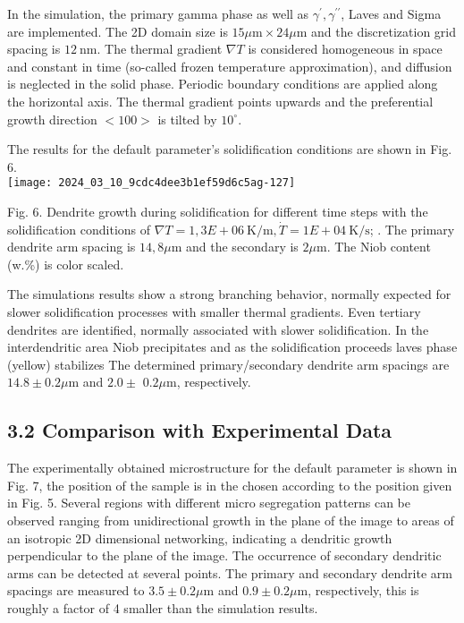 \documentclass[10pt]{article}
\begin{document}
In the simulation, the primary gamma phase as well as $\gamma^{\prime}, \gamma^{\prime \prime}$, Laves and Sigma are implemented. The 2D domain size is $15 \mu \mathrm{m} \times 24 \mu \mathrm{m}$ and the discretization grid spacing is $12 \mathrm{~nm}$. The thermal gradient $\nabla T$ is considered homogeneous in space and constant in time (so-called frozen temperature approximation), and diffusion is neglected in the solid phase. Periodic boundary conditions are applied along the horizontal axis. The thermal gradient points upwards and the preferential growth direction $<100>$ is tilted by $10^{\circ}$.

The results for the default parameter's solidification conditions are shown in Fig. 6.\\
\texttt{[image: 2024\_03\_10\_9cdc4dee3b1ef59d6c5ag-127]}

Fig. 6. Dendrite growth during solidification for different time steps with the solidification conditions of $\nabla T=1,3 E+06 \mathrm{~K} / \mathrm{m}, \dot{T}=1 E+04 \mathrm{~K} / \mathrm{s}$; . The primary dendrite arm spacing is $14,8 \mu \mathrm{m}$ and the secondary is $2 \mu \mathrm{m}$. The Niob content (w.\%) is color scaled.

The simulations results show a strong branching behavior, normally expected for slower solidification processes with smaller thermal gradients. Even tertiary dendrites are identified, normally associated with slower solidification. In the interdendritic area Niob precipitates and as the solidification proceeds laves phase (yellow) stabilizes The determined primary/secondary dendrite arm spacings are $14.8 \pm 0.2 \mu \mathrm{m}$ and $2.0 \pm$ $0.2 \mu \mathrm{m}$, respectively.

\subsection*{3.2 Comparison with Experimental Data}
The experimentally obtained microstructure for the default parameter is shown in Fig. 7, the position of the sample is in the chosen according to the position given in Fig. 5. Several regions with different micro segregation patterns can be observed ranging from unidirectional growth in the plane of the image to areas of an isotropic 2D dimensional networking, indicating a dendritic growth perpendicular to the plane of the image. The occurrence of secondary dendritic arms can be detected at several points. The primary and secondary dendrite arm spacings are measured to $3.5 \pm 0.2 \mu \mathrm{m}$ and $0.9 \pm 0.2 \mu \mathrm{m}$, respectively, this is roughly a factor of 4 smaller than the simulation results.
\end{document}

